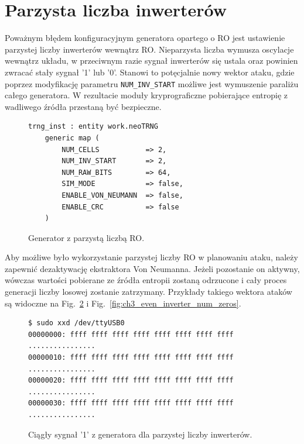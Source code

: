 \section{Parzysta liczba inwerterów}

Poważnym błędem konfiguracyjnym generatora opartego o RO jest ustawienie 
parzystej liczby inwerterów wewnątrz RO. Nieparzysta liczba wymusza 
oscylacje wewnątrz układu, w przeciwnym razie sygnał inwerterów się ustala 
oraz powinien zwracać stały sygnał '1' lub '0'. Stanowi to potęcjalnie 
nowy wektor ataku, gdzie poprzez modyfikację parametru \texttt{NUM\_INV\_START} 
możliwe jest wymuszenie paraliżu całego generatora. W rezultacie moduły 
kryprograficzne pobierające entropię z wadliwego źródła przestaną być 
bezpieczne.

\begin{figure}[H]
    \centering
    \begin{verbatim}
trng_inst : entity work.neoTRNG
    generic map (
        NUM_CELLS           => 2,
        NUM_INV_START       => 2,
        NUM_RAW_BITS        => 64,
        SIM_MODE            => false,
        ENABLE_VON_NEUMANN  => false,
        ENABLE_CRC          => false
    )
    \end{verbatim}
    \caption{Generator z parzystą liczbą RO.}
    \label{fig:ch3_even_inverter_num}
\end{figure}

Aby możliwe było wykorzystanie parzystej liczby RO w planowaniu ataku, należy 
zapewnić dezaktywację ekstraktora Von Neumanna. Jeżeli pozostanie on aktywny, 
wówczas wartości pobierane ze źródła entropii zostaną odrzucone i cały proces 
generacji liczby losowej zostanie zatrzymany. Przykłady takiego wektora ataków 
są widoczne na Fig.~\ref{fig:ch3_even_inverter_num_ones} i Fig.~\ref{fig:ch3_even_inverter_num_zeros}.

\begin{figure}[H]
    \centering
    \begin{verbatim}
$ sudo xxd /dev/ttyUSB0
00000000: ffff ffff ffff ffff ffff ffff ffff ffff  ................
00000010: ffff ffff ffff ffff ffff ffff ffff ffff  ................
00000020: ffff ffff ffff ffff ffff ffff ffff ffff  ................
00000030: ffff ffff ffff ffff ffff ffff ffff ffff  ................
    \end{verbatim}
    \caption{Ciągły sygnał '1' z generatora dla parzystej liczby inwerterów.}
    \label{fig:ch3_even_inverter_num_ones}
\end{figure}


